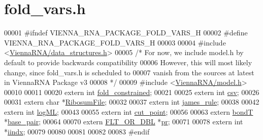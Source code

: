 \hypertarget{fold__vars_8h_source}{}\section{fold\+\_\+vars.\+h}
\label{fold__vars_8h_source}

\begin{DoxyCode}
00001 \textcolor{preprocessor}{#ifndef VIENNA\_RNA\_PACKAGE\_FOLD\_VARS\_H}
00002 \textcolor{preprocessor}{#define VIENNA\_RNA\_PACKAGE\_FOLD\_VARS\_H}
00003 
00004 \textcolor{preprocessor}{#include <\mbox{\hyperlink{data__structures_8h}{ViennaRNA/data\_structures.h}}>}
00005 \textcolor{comment}{/*  For now, we include model.h by default to provide backwards compatibility}
00006 \textcolor{comment}{    However, this will most likely change, since fold\_vars.h is scheduled to}
00007 \textcolor{comment}{    vanish from the sources at latest in ViennaRNA Package v3}
00008 \textcolor{comment}{*/}
00009 \textcolor{preprocessor}{#include <\mbox{\hyperlink{model_8h}{ViennaRNA/model.h}}>}
00010 
00011 
00020 \textcolor{keyword}{extern} \textcolor{keywordtype}{int}    \mbox{\hyperlink{fold__vars_8h_a0afc287c2464866d94858c39175154af}{fold\_constrained}};
00021 
00025 \textcolor{keyword}{extern} \textcolor{keywordtype}{int}  \mbox{\hyperlink{fold__vars_8h_af2763d55a74663a5e60652b8880baa5b}{csv}};
00026 
00031 \textcolor{keyword}{extern} \textcolor{keywordtype}{char} *\mbox{\hyperlink{fold__vars_8h_a5dbaa0cca2c8c82048a0f0e38e164944}{RibosumFile}};   
00032 
00037 \textcolor{keyword}{extern} \textcolor{keywordtype}{int}  \mbox{\hyperlink{fold__vars_8h_af349001ad3b4d008d0051d935b1b6261}{james\_rule}};
00038 
00042 \textcolor{keyword}{extern} \textcolor{keywordtype}{int}  \mbox{\hyperlink{fold__vars_8h_a80c3c5fd35e7479704cc91d2d0367743}{logML}};
00043 
00055 \textcolor{keyword}{extern} \textcolor{keywordtype}{int}  \mbox{\hyperlink{fold__vars_8h_ab9b2c3a37a5516614c06d0ab54b97cda}{cut\_point}};
00056 
00063 \textcolor{keyword}{extern} \mbox{\hyperlink{group__data__structures_structvrna__bp__stack__s}{bondT}}  *\mbox{\hyperlink{fold__vars_8h_a0244a629b5ab4f58b77590c3dfd130dc}{base\_pair}};
00064 
00070 \textcolor{keyword}{extern} \mbox{\hyperlink{group__data__structures_ga31125aeace516926bf7f251f759b6126}{FLT\_OR\_DBL}} *\mbox{\hyperlink{fold__vars_8h_ac98ec419070aee6831b44e5c700f090f}{pr}};
00071 
00078 \textcolor{keyword}{extern} \textcolor{keywordtype}{int}   *\mbox{\hyperlink{fold__vars_8h_a92089ae3a51b5d75a14ce9cc29cc8317}{iindx}};
00079 
00080 
00081 
00082 
00083 \textcolor{preprocessor}{#endif}
\end{DoxyCode}
